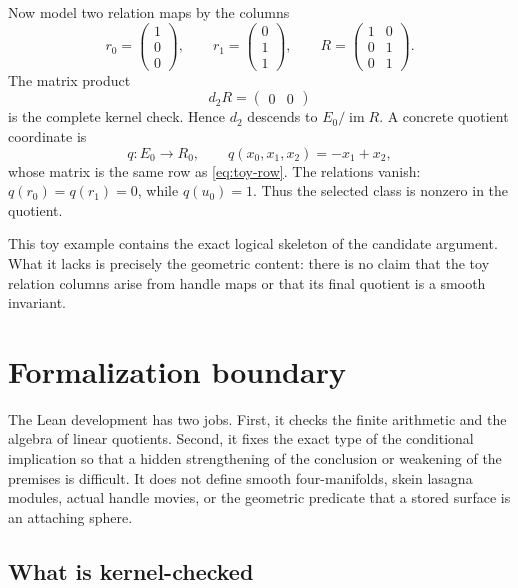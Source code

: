 \documentclass[10pt,reqno]{amsart}
\theoremstyle{definition}
\theoremstyle{remark}
\newcommand{\im}{\operatorname{im}}
\begin{document}
Now model two relation maps by the columns
\begin{equation}\label{eq:toy-relations}
r_0=\begin{pmatrix}1\\0\\0\end{pmatrix},
\qquad
r_1=\begin{pmatrix}0\\1\\1\end{pmatrix},
\qquad
R=\begin{pmatrix}1&0\\0&1\\0&1\end{pmatrix}.
\end{equation}
The matrix product
\begin{equation}\label{eq:toy-kernel-check}
d_2R=\begin{pmatrix}0&0\end{pmatrix}
\end{equation}
is the complete kernel check.  Hence $d_2$ descends to
$E_0/\im R$.  A concrete quotient coordinate is
\begin{equation}\label{eq:toy-quotient}
q:E_0\longrightarrow R_0,\qquad
q(x_0,x_1,x_2)=-x_1+x_2,
\end{equation}
whose matrix is the same row as \cref{eq:toy-row}.  The relations vanish:
$q(r_0)=q(r_1)=0$, while $q(u_0)=1$.  Thus the selected class is nonzero in
the quotient.

This toy example contains the exact logical skeleton of the candidate
argument.  What it lacks is precisely the geometric content: there is no
claim that the toy relation columns arise from handle maps or that its final
quotient is a smooth invariant.

\section{Formalization boundary}\label{sec:lean}

The Lean development has two jobs.  First, it checks the finite arithmetic
and the algebra of linear quotients.  Second, it fixes the exact type of the
conditional implication so that a hidden strengthening of the conclusion or
weakening of the premises is difficult.  It does not define smooth
four-manifolds, skein lasagna modules, actual handle movies, or the geometric
predicate that a stored surface is an attaching sphere.

\subsection{What is kernel-checked}
\end{document}
